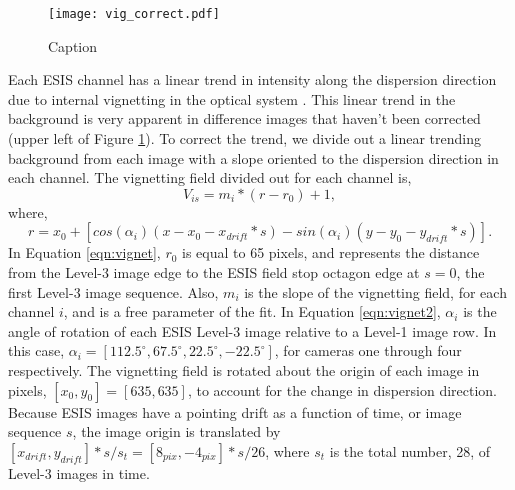  		\begin{figure}[htb!]
			\centering
			\texttt{[image: vig\_correct.pdf]}
			\caption{Caption}
			\label{fig:vig_correct}
		\end{figure}
	       	
        Each ESIS channel has a linear trend in intensity along the dispersion direction due to internal vignetting in the optical system \citep{ESIS}.
        This linear trend in the background is very apparent in difference images that haven't been corrected (upper left of Figure \ref{fig:vig_correct}).
        To correct the trend, we divide out a linear trending background from each image with a slope oriented to the dispersion direction in each channel.
        The vignetting field divided out for each channel is,
        \begin{equation}
            V_{is} = m_{i} * (r - r_0) + 1,
            \label{eqn:vignet}
        \end{equation}
       	where,
       	\begin{equation}
        	r = x_0 + [cos(\alpha_i)(x-x_0-x_{drift}*s) - sin(\alpha_i)(y-y_0-y_{drift}*s)].
        	\label{eqn:vignet2}
       	\end{equation}
       	In Equation \ref{eqn:vignet}, $r_0$ is equal to 65 pixels, and represents the distance from the Level-3 image edge to the ESIS field stop octagon edge at $s = 0$, the first Level-3 image sequence.
       	Also, $m_{i}$ is the slope of the vignetting field, for each channel $i$, and is a free parameter of the fit.
        In Equation \ref{eqn:vignet2},  $\alpha_i$ is the angle of rotation of each ESIS Level-3 image relative to a Level-1 image row.
        In this case, $\alpha_i = [112.5^{\circ}, 67.5^{\circ}, 22.5^{\circ}, -22.5^{\circ}]$, for cameras one through four respectively.
        The vignetting field is rotated about the origin of each image in pixels, $[x_0, y_0] = [635,635]$, to account for the change in dispersion direction.
        Because ESIS images have a pointing drift as a function of time, or image sequence $s$, the image origin is translated by $[x_{drift},y_{drift}]*s/s_t = [8_{pix},-4_{pix}]*s/26$, where $s_t $ is the total number, 28, of Level-3 images in time.
        
